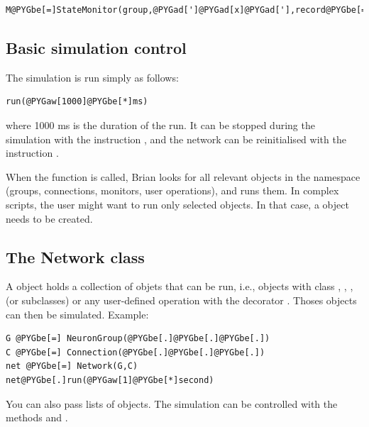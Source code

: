 \documentclass[letterpaper,10pt]{manual}
\begin{document}
\begin{Verbatim}[commandchars=@\[\]]
M@PYGbe[=]StateMonitor(group,@PYGad[']@PYGad[x]@PYGad['],record@PYGbe[=]@PYGaA[True],when@PYGbe[=]@PYGad[']@PYGad[before_resets]@PYGad['])
\end{Verbatim}


\subsection{Basic simulation control}

The simulation is run simply as follows:

\begin{Verbatim}[commandchars=@\[\]]
run(@PYGaw[1000]@PYGbe[*]ms)
\end{Verbatim}

where 1000 ms is the duration of the run. It can be stopped during the simulation with the instruction
, and the network can be reinitialised with the instruction .

When the \hyperlink{brian.run}{} function is called, Brian looks for all relevant
objects in the namespace (groups, connections, monitors, user operations), and runs them.
In complex scripts, the user might want to run only selected objects. In that case, a \hyperlink{brian.Network}{} object
needs to be created.


\subsection{The Network class}

A \hyperlink{brian.Network}{} object holds a collection of objets that can be run, i.e., objects with class \hyperlink{brian.NeuronGroup}{},
\hyperlink{brian.Connection}{}, \hyperlink{brian.SpikeMonitor}{}, \hyperlink{brian.StateMonitor}{} (or subclasses) or any user-defined operation with the decorator
\hyperlink{brian.network_operation}{}. Thoses objects can then be simulated. Example:

\begin{Verbatim}[commandchars=@\[\]]
G @PYGbe[=] NeuronGroup(@PYGbe[.]@PYGbe[.]@PYGbe[.])
C @PYGbe[=] Connection(@PYGbe[.]@PYGbe[.]@PYGbe[.])
net @PYGbe[=] Network(G,C)
net@PYGbe[.]run(@PYGaw[1]@PYGbe[*]second)
\end{Verbatim}

You can also pass lists of objects. The simulation can be controlled with the methods
 and .
\end{document}
